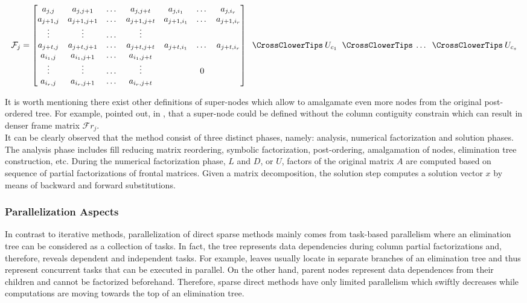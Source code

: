  \begin{equation} \label{eq:mm-10}
	\mathcal{F}_{j} = \begin{bmatrix}a_{j,j} & a_{j,j+1} & \dots & a_{j,j+t}  & a_{j,i_1} & \dots & a_{j,i_r} \\
a_{j+1,j} & a_{j+1,j+1} & \dots & a_{j+1,j+t}  & a_{j+1,i_1} & \dots & a_{j+1,i_r} \\
\vdots & \vdots & \dots & \vdots \\
a_{j+t,j}  & a_{j+t,j+1} & \dots & a_{j+t,j+t}  & a_{j+t,i_1} & \dots & a_{j+t,i_r} \\
a_{i_1,j} & a_{i_1,j+1} & \dots & a_{i_1,j+t} \\
\vdots & \vdots & \dots & \vdots  & & 0\\ 
a_{i_r,j} & a_{i_r,j+1} & \dots & a_{i_r,j+t} \\
\end{bmatrix} \extendadd U_{c_1} \extendadd \dots \extendadd U_{c_s} 
\end{equation}


It is worth mentioning there exist other definitions of super-nodes which allow to amalgamate even more nodes from the original post-ordered tree. For example, \citeauthor{mult-frontal-original:2} pointed out, in \cite{mult-frontal-original:2}, that a super-node could be defined without the column contiguity constrain which can result in denser frame matrix $\mathcal{F}r_{j}$.\\


It can be clearly observed that the method consist of three distinct phases, namely: analysis, numerical factorization and solution phases. The analysis phase includes fill reducing matrix reordering, symbolic factorization, post-ordering, amalgamation of nodes, elimination tree construction, etc. During the numerical factorization phase, $L$ and $D$, or $U$, factors of the original matrix $A$ are computed based on sequence of partial factorizations of frontal matrices. Given a matrix decomposition, the solution step computes a solution vector $x$ by means of backward and forward substitutions.\\



\subsubsection{Parallelization Aspects}
\label{subseq:direct-parallel-aspects}


In contrast to iterative methods, parallelization of direct sparse methods mainly comes from task-based parallelism where an elimination tree can be considered as a collection of tasks. In fact, the tree represents data dependencies during column partial factorizations and, therefore, reveals dependent and independent tasks. For example, leaves usually locate in separate branches of an elimination tree and thus represent concurrent tasks that can be executed in parallel. On the other hand, parent nodes represent data dependences from their children and cannot be factorized beforehand. Therefore, sparse direct methods have only limited parallelism which swiftly decreases while computations are moving towards the top of an elimination tree.\\


